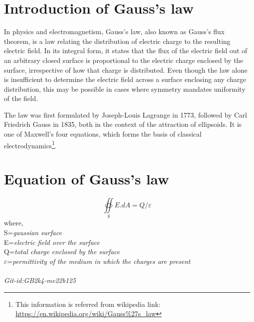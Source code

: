 \section{Introduction of Gauss's law}
In physics and electromagnetism, Gauss's law, also known as Gauss's flux theorem, is a law relating the distribution of electric charge to the resulting electric field. In its integral form, it states that the flux of the electric field out of an arbitrary closed surface is proportional to the electric charge enclosed by the surface, irrespective of how that charge is distributed. Even though the law alone is insufficient to determine the electric field across a surface enclosing any charge distribution, this may be possible in cases where symmetry mandates uniformity of the field.

The law was first formulated by Joseph-Louis Lagrange in 1773, followed by Carl Friedrich Gauss in 1835, both in the context of the attraction of ellipsoids. It is one of Maxwell's four equations, which forms the basis of classical electrodynamics\footnote{This information is referred from wikipedia link: \url{https://en.wikipedia.org/wiki/Gauss\%27s\_law}}.
\section{Equation of Gauss's law}

\[ \oiint\limits_S E.dA=Q/{\varepsilon} \]
where,\\
\indent S=\textit{gaussian surface}\\
\indent E=\textit{electric field over the surface}\\
\indent Q=\textit{total charge enclosed by the surface}\\
\indent $\varepsilon$=\textit{permittivity of the medium in which the charges are present}\\ \\
\indent \textit{Git-id:GB2k4-me22b125}
